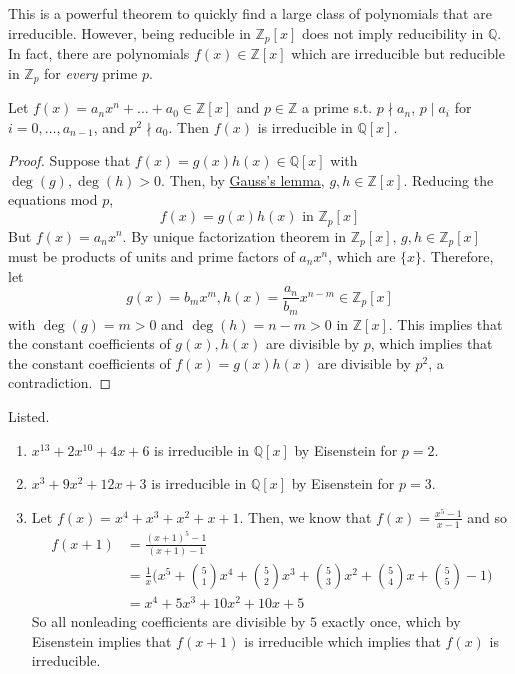   This is a powerful theorem to quickly find a large class of polynomials that are irreducible. However, being reducible in $\mathbb{Z}_p [x]$ does not imply reducibility in $\mathbb{Q}$. In fact, there are polynomials $f(x) \in \mathbb{Z}[x]$ which are irreducible but reducible in $\mathbb{Z}_p$ for \textit{every} prime $p$. 

  \begin{theorem}
    \label{thm:eisensteins-criterion}
    Let $f(x) = a_n x^n + \ldots + a_0 \in \mathbb{Z}[x]$ and $p \in \mathbb{Z}$ a prime s.t. $p \nmid a_n$, $p \mid a_i$ for $i = 0, \ldots, a_{n-1}$, and $p^2 \nmid a_0$. Then $f(x)$ is irreducible in $\mathbb{Q}[x]$. 
  \end{theorem}
  \begin{proof}
    Suppose that $f(x) = g(x) h(x) \in \mathbb{Q}[x]$ with $\deg(g), \deg(h) > 0$. Then, by \hyperref[thm:gausss-lemma]{Gauss's lemma}, $g, h \in \mathbb{Z}[x]$. Reducing the equations mod $p$, 
    \begin{equation}
      f(x) = g(x) h(x) \text{ in } \mathbb{Z}_p [x]
    \end{equation}
    But $f(x) = a_n x^n$. By unique factorization theorem in $\mathbb{Z}_p [x]$, $g, h \in \mathbb{Z}_p [x]$ must be products of units and prime factors of $a_n x^n$, which are $\{x\}$. Therefore, let 
    \begin{equation}
      g(x) = b_m x^m, h(x) = \frac{a_n}{b_m} x^{n-m} \in \mathbb{Z}_p [x]
    \end{equation}
    with $\deg(g) = m > 0$ and $\deg(h) = n - m > 0$ in $\mathbb{Z}[x]$. This implies that the constant coefficients of $g(x), h(x)$ are divisible by $p$, which implies that the constant coefficients of $f(x) = g(x) h(x)$ are divisible by $p^2$, a contradiction. 
  \end{proof}

  \begin{example}
    \label{ex:easy-checks-for-irreducibility-with-eisenstein}
    Listed. 
    \begin{enumerate}
      \item $x^{13} + 2x^{10} + 4x + 6$ is irreducible in $\mathbb{Q}[x]$ by Eisenstein for $p = 2$. 
      \item $x^3 + 9x^2 + 12x + 3$ is irreducible in $\mathbb{Q}[x]$ by Eisenstein for $p = 3$. 
      \item Let $f(x) = x^4 + x^3 + x^2 + x + 1$. Then, we know that $f(x) = \frac{x^5 - 1}{x-1}$ and so 
      \begin{align}
        f(x + 1) & = \frac{(x + 1)^5 - 1}{(x + 1) - 1} \\
                 & = \frac{1}{x} \bigg( x^5 + \binom{5}{1} x^4 + \binom{5}{2} x^3 + \binom{5}{3} x^2 + \binom{5}{4} x + \binom{5}{5} - 1 \bigg) \\
                 & = x^4 + 5x^3 + 10 x^2 + 10x + 5
      \end{align}
      So all nonleading coefficients are divisible by $5$ exactly once, which by Eisenstein implies that $f(x+1)$ is irreducible which implies that $f(x)$ is irreducible. 
    \end{enumerate}
  \end{example}

